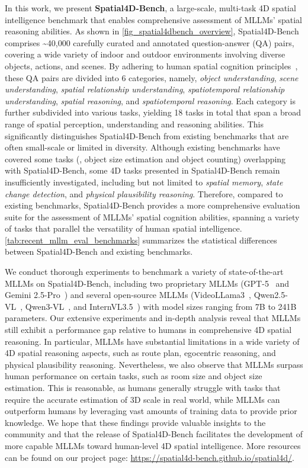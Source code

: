 In this work, we present \textbf{Spatial4D-Bench}, a large-scale, multi-task 4D spatial intelligence benchmark that enables comprehensive assessment of MLLMs' spatial reasoning abilities. As shown in \cref{fig_spatial4dbench_overview}, Spatial4D-Bench comprises \textasciitilde40,000 carefully curated and annotated question-answer (QA) pairs, covering a wide variety of indoor and outdoor environments involving diverse objects, actions, and scenes.
By adhering to human spatial cognition principles~\cite{waller2013handbook, newcombe2004spatial}, these QA pairs are divided into 6 categories, namely, \textit{object understanding}, \textit{scene understanding}, \textit{spatial relationship understanding}, \textit{spatiotemporal relationship understanding}, \textit{spatial reasoning}, and \textit{spatiotemporal reasoning}.
Each category is further subdivided into various tasks, yielding 18 tasks in total that span a broad range of spatial perception, understanding and reasoning abilities.
This significantly distinguishes Spatial4D-Bench from existing benchmarks that are often small-scale or limited in diversity.
Although existing benchmarks have covered some tasks (\eg, object size estimation and object counting) overlapping with Spatial4D-Bench, some 4D tasks presented in Spatial4D-Bench remain insufficiently investigated, including but not limited to \textit{spatial memory}, \textit{state change detection}, and \textit{physical plausibility reasoning}.
Therefore, compared to existing benchmarks, Spatial4D-Bench provides a more comprehensive evaluation suite for the assessment of MLLMs' spatial cognition abilities, spanning a variety of tasks that parallel the versatility of human spatial intelligence. 
\cref{tab:recent_mllm_eval_benchmarks} summarizes the statistical differences between Spatial4D-Bench and existing benchmarks.

We conduct thorough experiments to benchmark a variety of state-of-the-art MLLMs on Spatial4D-Bench, including two proprietary MLLMs (GPT-5~\cite{OpenAI2025} and Gemini 2.5-Pro~\cite{Gemini2025}) and several open-source MLLMs (VideoLLama3~\cite{zhang2025videollama}, Qwen2.5-VL~\cite{bai2025qwen2}, Qwen3-VL~\cite{bai2025qwen2}, and InternVL3.5~\cite{wang2025internvl3}) with model sizes ranging from 7B to 241B parameters.
Our extensive experiments and in-depth analysis reveal that MLLMs still exhibit a performance gap relative to humans in comprehensive 4D spatial reasoning.
In particular, MLLMs have substantial limitations in a wide variety of 4D spatial reasoning aspects, such as route plan, egocentric reasoning, and physical plausibility reasoning.
Nevertheless, we also observe that MLLMs surpass human performance on certain tasks, such as room size and object size estimation.
This is reasonable, as humans generally struggle with tasks that require the accurate estimation of 3D scale in real world, while MLLMs can outperform humans by leveraging vast amounts of training data to provide prior knowledge.
We hope that these findings provide valuable insights to the community and that the release of Spatial4D-Bench facilitates the development of more capable MLLMs toward human-level 4D spatial intelligence.
More resources can be found on our project page: \url{https://spatial4d-bench.github.io/spatial4d/}.

